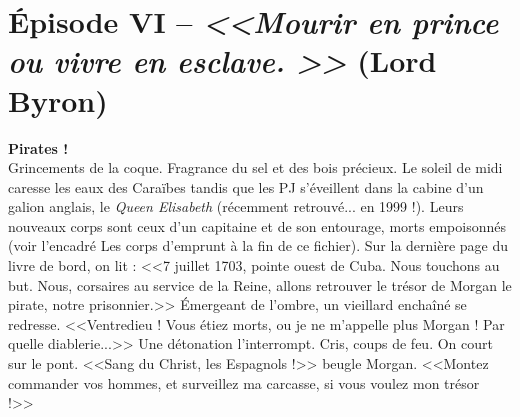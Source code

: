 \documentclass[11pt,twoside,a4paper]{book}
\begin{document}
\section*{{\'E}pisode VI -- \emph{<<\textbf{Mourir en prince ou vivre en esclave. }>>} (Lord Byron)}


\textbf{\large Pirates !}~\\

Grincements de la coque. Fragrance du sel et des bois pr{\'e}cieux. Le soleil de midi caresse les eaux des Cara{\"i}bes tandis que les PJ s'{\'e}veillent dans la cabine d'un galion anglais, le \emph{Queen Elisabeth} (r{\'e}cemment retrouv{\'e}... en 1999 !). Leurs nouveaux corps sont ceux d'un capitaine et de son entourage, morts empoisonn{\'e}s (voir l'encadr{\'e} Les corps d'emprunt {\`a} la fin de ce fichier). Sur la derni{\`e}re page du livre de bord, on lit : <<7 juillet 1703, pointe ouest de Cuba. Nous touchons au but. Nous, corsaires au service de la Reine, allons retrouver le tr{\'e}sor de Morgan le pirate, notre prisonnier.>> {\'E}mergeant de l'ombre, un vieillard encha{\^i}n{\'e} se redresse. <<Ventredieu ! Vous {\'e}tiez morts, ou je ne m'appelle plus Morgan ! Par quelle diablerie...>> Une d{\'e}tonation l'interrompt. Cris, coups de feu. On court sur le pont. <<Sang du Christ, les Espagnols !>> beugle Morgan. <<Montez commander vos hommes, et surveillez ma carcasse, si vous voulez mon tr{\'e}sor !>>~\\
\end{document}
